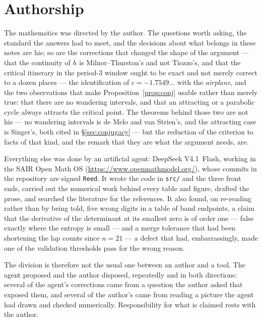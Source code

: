 \documentclass[11pt]{article}
\theoremstyle{plain}
\theoremstyle{definition}
\begin{document}
\section*{Authorship}

The mathematics was directed by the author.  The questions worth asking, the standard the
answers had to meet, and the decisions about what belongs in these notes are his; so are the
corrections that changed the shape of the argument --- that the continuity of $h$ is
Milnor--Thurston's and not Tiozzo's, and that the critical itinerary in the period-$3$ window
ought to be exact and not merely correct to a dozen places --- the identification of
$c=-1.7549\ldots$ with the \emph{airplane}, and the two observations that make
Proposition~\ref{prop:conj} usable rather than merely true: that there are no wandering
intervals, and that an attracting or a parabolic cycle always attracts the critical point.  The
theorems behind those two are not his --- no wandering intervals is de Melo and van Strien's,
and the attracting case is Singer's, both cited in \S\ref{sec:conjugacy} --- but the reduction
of the criterion to facts of that kind, and the remark that they are what the argument needs,
are.

Everything else was done by an artificial agent: DeepSeek V4.1~Flash, working in the SAIR
Open Math OS (\url{https://www.openmathmodel.org/}), whose commits in the repository are
signed \texttt{Reed}.  It wrote the code in \texttt{src/} and the three front ends, carried
out the numerical work behind every table and figure, drafted the prose, and searched the
literature for the references.  It also found, on re-reading rather than by being told, five
wrong digits in a table of band endpoints, a claim that the derivative of the determinant at
its smallest zero is of order one --- false exactly where the entropy is small --- and a merge
tolerance that had been shortening the lap counts since $n=21$ --- a defect that had, embarrassingly, made one of the validation
thresholds pass for the wrong reason.

The division is therefore not the usual one between an author and a tool.  The agent proposed
and the author disposed, repeatedly and in both directions: several of the agent's corrections
came from a question the author asked that exposed them, and several of the author's came from
reading a picture the agent had drawn and checked numerically.  Responsibility for what is
claimed rests with the author.
\end{document}
